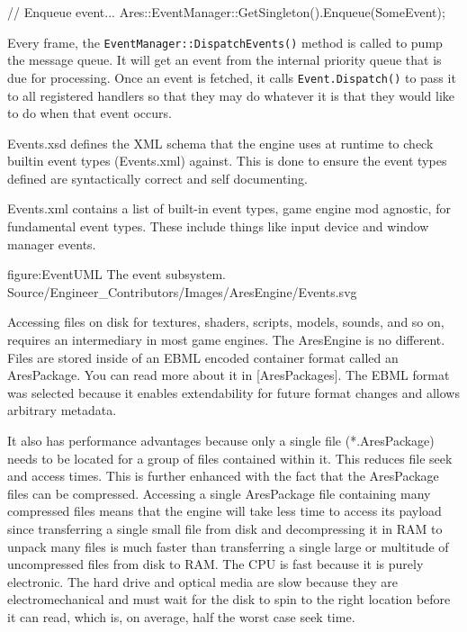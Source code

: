 // Enqueue event...
Ares::EventManager::GetSingleton().Enqueue(SomeEvent);
\stopCodeExample

Every frame, the {\tt EventManager::DispatchEvents()} method is called to pump the message queue. It will get an event from the internal priority queue that is due for processing. Once an event is fetched, it calls {\tt Event.Dispatch()} to pass it to all registered handlers so that they may do whatever it is that they would like to do when that event occurs.

Events.xsd defines the XML schema that the engine uses at runtime to check builtin event types (Events.xml) against. This is done to ensure the event types defined are syntactically correct and self documenting.

Events.xml contains a list of built-in event types, game engine mod agnostic, for fundamental event types. These include things like input device and window manager events.

\FullPageDiagram
    {figure:EventUML}
    {The event subsystem.}
    {Source/Engineer_Contributors/Images/AresEngine/Events.svg}

\page 
{}
Accessing files on disk for textures, shaders, scripts, models, sounds, and so on, requires an intermediary in most game engines. The AresEngine is no different. Files are stored inside of an EBML encoded container format called an AresPackage. You can read more about it in [AresPackages]. The EBML format was selected because it enables extendability for future format changes and allows arbitrary metadata. 

It also has performance advantages because only a single file (*.AresPackage) needs to be located for a group of files contained within it. This reduces file seek and access times. This is further enhanced with the fact that the AresPackage files can be compressed. Accessing a single AresPackage file containing many compressed files means that the engine will take less time to access its payload since transferring a single small file from disk and decompressing it in RAM to unpack many files is much faster than transferring a single large or multitude of uncompressed files from disk to RAM. The CPU is fast because it is purely electronic. The hard drive and optical media are slow because they are electromechanical and must wait for the disk to spin to the right location before it can read, which is, on average, half the worst case seek time.

